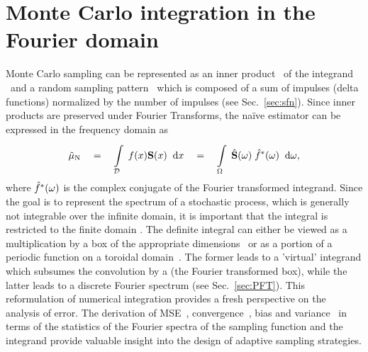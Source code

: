 \documentclass[11pt,fleqn]{book} %
\newcommand{\TBC} {}
\begin{document}


\section{Monte Carlo integration in the Fourier domain}
Monte Carlo sampling can be represented as an inner product~\cite{FredoTR} of the integrand \ifn\ and a random sampling pattern \sfn\ which is composed of a sum of impulses (delta functions) normalized by the number of impulses (see Sec.~\ref{sec:sfn}). Since inner products are preserved under Fourier Transforms, the na\"ive estimator  can be expressed in the frequency domain as 
\begin{equation}
  \tilde\mu_\mathrm{N} \quad = \quad \displaystyle\int\limits_{\mathcal{D}}^{} \; f(x) \mathbf{S}(x) \;\; \mathrm{d}x \quad = \quad 
  \displaystyle\int\limits_{\Omega}^{} \; \hat{\mathbf{S}}(\omega) \; \hat{f}^*(\omega)  \;\; \mathrm{d}\omega, 
\end{equation}
where $\hat{f}^*(\omega)$ is the complex conjugate of the Fourier transformed integrand. Since the goal is to represent the spectrum of a stochastic process, which is generally not integrable over the infinite domain, it is important that the integral is restricted to the finite domain \Dom. The definite integral can either be viewed as a multiplication by a box of the appropriate dimensions~\cite{Subr:2013:FAS} or as a portion of a periodic function on a toroidal domain~\cite{Pilleboue:2015:VAM}. The former leads to a 'virtual' integrand which subsumes the convolution by a \sinc (the Fourier transformed box), while the latter leads to a discrete Fourier spectrum (see Sec.~\ref{sec:PFT}). This reformulation of numerical integration provides a fresh perspective on the analysis of error. The derivation of MSE~\cite{FredoTR}, convergence~\cite{Pilleboue:2015:VAM}, bias and variance~\cite{Subr:2013:FAS} in terms of the statistics of the Fourier spectra of the sampling function and the integrand provide valuable insight into the design of adaptive sampling strategies.
\end{document}
